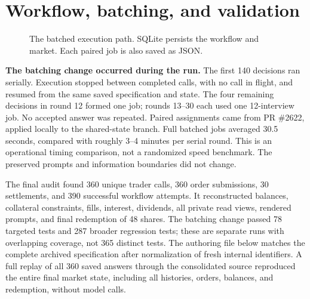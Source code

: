 \documentclass[11pt,letterpaper]{article}
\newcommand{\code}[1]{\texttt{\small #1}}
\begin{document}
\clearpage
\section{Workflow, batching, and validation}
\begin{figure}[H]
\centering
{}
\caption{The batched execution path. SQLite persists the workflow and market.
Each paired job is also saved as JSON.}
\end{figure}

\textbf{The batching change occurred during the run.} The first 140 decisions
ran serially. Execution stopped between completed calls, with no call in
flight, and resumed from the same saved specification and state. The four
remaining decisions in round 12 formed one job; rounds 13--30 each used one
12-interview job. No accepted answer was repeated. Paired assignments came
from PR \#2622, applied locally to the shared-state branch. Full batched jobs
averaged 30.5 seconds, compared with roughly 3--4 minutes per serial round.
This is an operational timing comparison, not a randomized speed benchmark.
The preserved prompts and information boundaries did not change.

The final audit found 360 unique trader calls, 360 order submissions, 30
settlements, and 390 successful workflow attempts. It reconstructed balances,
collateral constraints, fills, interest, dividends, all private read views,
rendered prompts, and final redemption of 48 shares. The batching change
passed 78 targeted tests and 287 broader regression tests; these are separate
runs with overlapping coverage, not 365 distinct tests. The authoring file
below matches the complete archived specification after normalization of
fresh internal identifiers. A full replay of all 360 saved answers through
the consolidated source reproduced the entire final market state, including
all histories, orders, balances, and redemption, without model calls.
\end{document}
